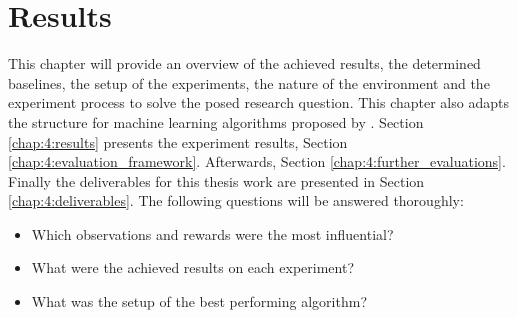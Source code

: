 
\chapter{Results}\label{chap:4}


    
This chapter will provide an overview of the achieved results, the determined baselines, the setup of the experiments, the nature of the environment and the experiment process to solve the posed research question. 
This chapter also adapts the structure for machine learning algorithms proposed by \textcite{luckert2016using}.
Section \ref{chap:4:results} presents the experiment results, Section \ref{chap:4:evaluation_framework}. Afterwards, Section \ref{chap:4:further_evaluations}. Finally the deliverables for this thesis work are presented in Section \ref{chap:4:deliverables}. The following questions will be answered thoroughly:
\begin{itemize}

    
    \item Which observations and rewards were the most influential?
    \item What were the achieved results on each experiment?
    \item What was the setup of the best performing algorithm?
\end{itemize}

